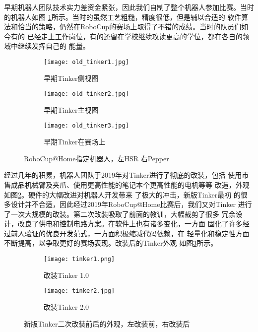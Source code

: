 早期机器人团队技术实力差资金紧张，因此我们自制了整个机器人参加比赛。当时的机器人如图
\ref{fig:old_tinker}所示。当时的虽然工艺粗糙，精度很低，但是辅以合适的
软件算法和恰当的策略，仍然在RoboCup的赛场上取得了不错的成绩。当时的队员们如今有的
已经走上工作岗位，有的还留在学校继续攻读更高的学位，都在各自的领域中继续发挥自己的
能量。


\begin{figure}[H]
\centering
\begin{subfigure}{.5\textwidth}
  \centering
  \texttt{[image: old\_tinker1.jpg]}
  \caption{早期Tinker侧视图}
\end{subfigure}%
\begin{subfigure}{.5\textwidth}
  \centering
  \texttt{[image: old\_tinker2.jpg]}
  \caption{早期Tinker主视图}
\end{subfigure}
\begin{subfigure}{.8\textwidth}
  \centering
  \texttt{[image: old\_tinker3.jpg]}
  \caption{早期Tinker在赛场上}
\end{subfigure}
\caption{RoboCup@Home指定机器人，左HSR 右Pepper}
\label{fig:old_tinker}
\end{figure}

经过几年的积累，机器人团队于2019年对Tinker进行了彻底的改装，包括
使用市售成品机械臂及夹爪、使用更高性能的笔记本个更高性能的电机等等
改造，外观如图\ref{fig:tinker1}。硬件的大幅改进对机器人开发带来
了极大的冲击，新版Tinker最初
的很多设计并不合适，因此经过2019年RoboCup@Home比赛后，我们又对Tinker
进行了一次大规模的改装。第二次改装吸取了前面的教训，大幅裁剪了很多
冗余设计，改良了供电和控制电路方案。在软件上也有诸多变化，一方面
固化了许多经过前人验证的优良开发范式，一方面积极缩减代码依赖，在
轻量化和稳定性方面不断提高，以争取更好的赛场表现。改装后的Tinker外观
如图\ref{fig:tinker2}所示。

\begin{figure}
\centering
\begin{subfigure}{.5\textwidth}
  \centering
  \texttt{[image: tinker1.png]}
  \caption{改装Tinker 1.0}
  \label{fig:tinker1}
\end{subfigure}%
\begin{subfigure}{.5\textwidth}
  \centering
  \texttt{[image: tinker2.jpg]}
  \caption{改装Tinker 2.0}
  \label{fig:tinker2}
\end{subfigure}
\caption{新版Tinker二次改装前后的外观，左改装前，右改装后}
\label{fig:tinker_new}
\end{figure}




\fi









